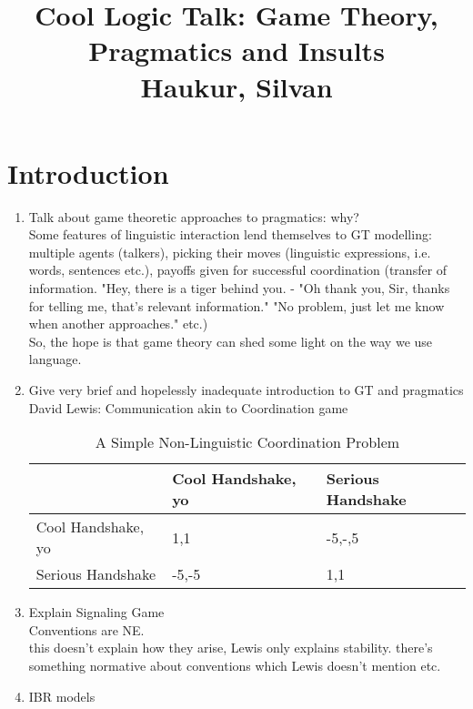 \documentclass[10pt,a4paper]{article}
\title{%
  Cool Logic Talk: Game Theory, Pragmatics and Insults \\
  \large Haukur, Silvan}
\date{}
\begin{document}
\maketitle
\section{Introduction}
\begin{enumerate}
\item Talk about game theoretic approaches to pragmatics: why?\\
Some features of linguistic interaction lend themselves to GT modelling: multiple agents (talkers), picking their moves (linguistic expressions, i.e. words, sentences etc.), payoffs given for successful coordination (transfer of information. "Hey, there is a tiger behind you. - "Oh thank you, Sir, thanks for telling me, that's relevant information." "No problem, just let me know when another approaches." etc.)\\
So, the hope is that game theory can shed some light on the way we use language.
\item Give very brief and hopelessly inadequate introduction to GT and pragmatics\\
David Lewis: Communication akin to Coordination game 
\begin{table}[h]
\centering
\caption{A Simple Non-Linguistic Coordination Problem}
\label{my-label}
\begin{tabular}{|l|l|l|}
\hline
                  & Cool Handshake, yo & Serious Handshake \\ \hline
Cool Handshake, yo    & 1,1            & -5,-,5            \\ \hline
Serious Handshake & -5,-5          & 1,1               \\ \hline
\end{tabular}
\end{table}
\item Explain Signaling Game\\
Conventions are NE.\\
this doesn't explain how they arise, Lewis only explains stability. there's something normative about conventions which Lewis doesn't mention etc.
\item IBR models
\end{enumerate}
\end{document}
